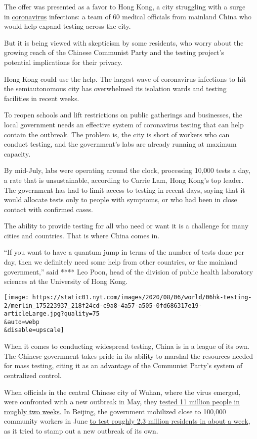 The offer was presented as a favor to Hong Kong, a city struggling with
a surge in
\href{https://www.nytimes.com/2020/08/07/us/covid-test-accuracy-governor-dewine-ohio.html}{coronavirus}
infections: a team of 60 medical officials from mainland China who would
help expand testing across the city.

But it is being viewed with skepticism by some residents, who worry
about the growing reach of the Chinese Communist Party and the testing
project's potential implications for their privacy.

Hong Kong could use the help. The largest wave of coronavirus infections
to hit the semiautonomous city has overwhelmed its isolation wards and
testing facilities in recent weeks.

To reopen schools and lift restrictions on public gatherings and
businesses, the local government needs an effective system of
coronavirus testing that can help contain the outbreak. The problem is,
the city is short of workers who can conduct testing, and the
government's labs are already running at maximum capacity.

By mid-July, labs were operating around the clock, processing 10,000
tests a day, a rate that is unsustainable, according to Carrie Lam, Hong
Kong's top leader. The government has had to limit access to testing in
recent days, saying that it would allocate tests only to people with
symptoms, or who had been in close contact with confirmed cases.

The ability to provide testing for all who need or want it is a
challenge for many cities and countries. That is where China comes in.

``If you want to have a quantum jump in terms of the number of tests
done per day, then we definitely need some help from other countries, or
the mainland government,'' said **** Leo Poon, head of the division of
public health laboratory sciences at the University of Hong Kong.

\texttt{[image: https://static01.nyt.com/images/2020/08/06/world/06hk-testing-2/merlin\_175223937\_218f24cd-c9a8-4a57-a505-0fd686317e19-articleLarge.jpg?quality=75\\\&auto=webp\\\&disable=upscale]}

When it comes to conducting widespread testing, China is in a league of
its own. The Chinese government takes pride in its ability to marshal
the resources needed for mass testing, citing it as an advantage of the
Communist Party's system of centralized control.

When officials in the central Chinese city of Wuhan, where the virus
emerged, were confronted with a new outbreak in May, they
\href{https://www.nytimes.com/2020/05/26/world/asia/coronavirus-wuhan-tests.html}{tested
11 million people in roughly two weeks.} In Beijing, the government
mobilized close to 100,000 community workers in June
\href{https://www.nytimes.com/2020/06/19/world/asia/coronavirus-china-beijing.html}{to
test roughly 2.3 million residents in about a week}, as it tried to
stamp out a new outbreak of its own.

